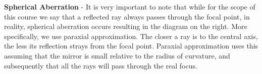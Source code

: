 \documentclass{article}
\begin{document}
\hspace{-15pt}\begin{minipage}{0.62\textwidth}
	\textbf{Spherical Aberration} - It is very important to note that while for the scope of this course we say that a reflected ray always passes through the focal point, in reality, spherical aberration occurs resulting in the diagram on the right. More specifically, we use paraxial approximation. The closer a ray is to the central axis, the less its reflection strays from the focal point. Paraxial approximation uses this assuming that the mirror is small relative to the radius of curvature, and subsequently that all the rays will pass through the real focus.
\end{minipage}
\begin{minipage}{0.2\textwidth} 
	\vspace{-10pt}
	\hspace*{5pt}		
	
\end{minipage}
\vspace{20pt}
\end{document}
